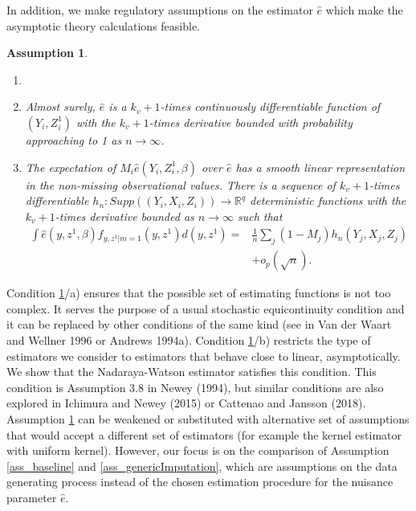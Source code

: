 \documentclass{article}
\newtheorem{assumption}{Assumption}
\theoremstyle{definition}
\theoremstyle{remark}
\begin{document}
In addition, we make regulatory assumptions on the estimator $\hat{e}$ which make the asymptotic theory calculations feasible.
\begin{assumption}\label{ass_genericEstimation}
	\begin{enumerate}
	\item[]
	\item[a)] Almost surely, $\hat{e}$ is a $k_v+1$-times continuously differentiable function of $(Y_i, Z^1_i)$ with the $k_v+1$-times derivative bounded with probability approaching to 1 as $n\rightarrow \infty$.
	\item[b)] The expectation of $M_i \hat{e}(Y_i,Z^1_i,\beta)$ over $\hat{e}$ has a smooth linear representation in the non-missing observational values. There is a sequence of $k_v+1$-times differentiable $h_n : Supp((Y_i,X_i,Z_i))\rightarrow \mathbb{R}^q$ deterministic functions with the $k_v+1$-times derivative bounded as $n\rightarrow \infty$ such that
	\begin{align*}
	\int \hat{e}(y,z^1,\beta) f_{y,z^1|m=1}(y,z^1)d(y,z^1) = &\frac{1}{n}\sum_j (1-M_j) h_n(Y_j, X_j, Z_j)  \\
	& + o_p(\sqrt{n}).
	\end{align*}
	\end{enumerate}
\end{assumption}
Condition \ref{ass_genericEstimation}/a) ensures that the possible set of estimating functions is not too complex. It serves the purpose of a usual stochastic equicontinuity condition and it can be replaced by other conditions of the same kind (see in Van der Waart and Wellner 1996 or Andrews 1994a). Condition \ref{ass_genericEstimation}/b) restricts the type of estimators we consider to estimators that behave close to linear, asymptotically. We show that the Nadaraya-Watson estimator satisfies this condition. This condition is Assumption 3.8 in Newey (1994), but similar conditions are also explored in Ichimura and Newey (2015) or Cattenao and Jansson (2018). Assumption \ref{ass_genericEstimation} can be weakened or substituted with alternative set of assumptions that would accept a different set of estimators (for example the kernel estimator with uniform kernel). However, our focus is on the comparison of Assumption \ref{ass_baseline} and \ref{ass_genericImputation}, which are assumptions on the data generating process instead of the chosen estimation procedure for the nuisance parameter $\hat{e}$.
\end{document}
